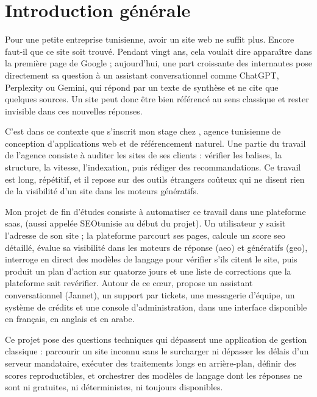 \chapter*{Introduction générale}

Pour une petite entreprise tunisienne, avoir un site web ne suffit plus. Encore faut-il que ce site soit trouvé. Pendant vingt ans, cela voulait dire apparaître dans la première page de Google ; aujourd'hui, une part croissante des internautes pose directement sa question à un assistant conversationnel comme ChatGPT, Perplexity ou Gemini, qui répond par un texte de synthèse et ne cite que quelques sources. Un site peut donc être bien référencé au sens classique et rester invisible dans ces nouvelles réponses. 

C'est dans ce contexte que s'inscrit mon stage chez \organisme, agence tunisienne de conception d'applications web et de référencement naturel. Une partie du travail de l'agence consiste à auditer les sites de ses clients : vérifier les balises, la structure, la vitesse, l'indexation, puis rédiger des recommandations. Ce travail est long, répétitif, et il repose sur des outils étrangers coûteux qui ne disent rien de la visibilité d'un site dans les moteurs génératifs.

Mon projet de fin d'études consiste à automatiser ce travail dans une plateforme \gls{saas}, \xapp{} (aussi appelée SEOtunisie au début du projet). Un utilisateur y saisit l'adresse de son site ; la plateforme parcourt ses pages, calcule un score \gls{seo} détaillé, évalue sa visibilité dans les moteurs de réponse (\gls{aeo}) et génératifs (\gls{geo}), interroge en direct des modèles de langage pour vérifier s'ils citent le site, puis produit un plan d'action sur quatorze jours et une liste de corrections que la plateforme sait revérifier. Autour de ce cœur, \xapp{} propose un assistant conversationnel (Jannet), un support par tickets, une messagerie d'équipe, un système de crédits et une console d'administration, dans une interface disponible en français, en anglais et en arabe.

Ce projet pose des questions techniques qui dépassent une application de gestion classique : parcourir un site inconnu sans le surcharger ni dépasser les délais d'un serveur mandataire, exécuter des traitements longs en arrière-plan, définir des scores reproductibles, et orchestrer des modèles de langage dont les réponses ne sont ni gratuites, ni déterministes, ni toujours disponibles.

